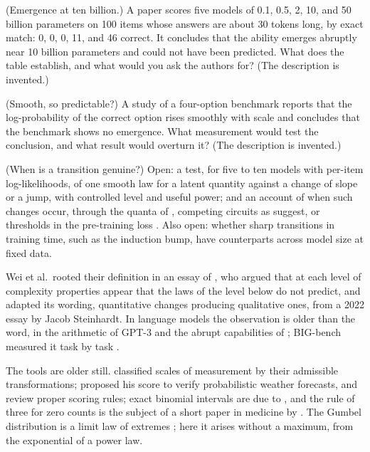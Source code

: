 \begin{refsection}
\begin{exercises}
\item \critique (Emergence at ten billion.) A paper scores five models of 0.1, 0.5, 2, 10, and 50 billion parameters on 100 items whose answers are about 30 tokens long, by exact match: 0, 0, 0, 11, and 46 correct. It concludes that the ability emerges abruptly near 10 billion parameters and could not have been predicted. What does the table establish, and what would you ask the authors for? (The description is invented.)\label{ex:emergence:critique1}

\item \critique (Smooth, so predictable?) A study of a four-option benchmark reports that the log-probability of the correct option rises smoothly with scale and concludes that the benchmark shows no emergence. What measurement would test the conclusion, and what result would overturn it? (The description is invented.)\label{ex:emergence:critique2}

\item \research (When is a transition genuine?) Open: a test, for five to ten models with per-item log-likelihoods, of one smooth law for a latent quantity against a change of slope or a jump, with controlled level and useful power; and an account of when such changes occur, through the quanta of \textcite{MichaudEtAl2023}, competing circuits as \textcite{HuEtAl2024} suggest, or thresholds in the pre-training loss \parencite{DuEtAl2024}. Also open: whether sharp transitions in training time, such as the induction bump, have counterparts across model size at fixed data.\label{ex:emergence:research}
\end{exercises}

\notesandrefs
Wei et al.\ rooted their definition in an essay of \textcite{Anderson1972}, who argued that at each level of complexity properties appear that the laws of the level below do not predict, and adapted its wording, quantitative changes producing qualitative ones, from a 2022 essay by Jacob Steinhardt. In language models the observation is older than the word, in the arithmetic of GPT-3 \parencite{BrownEtAl2020} and the abrupt capabilities of \textcite{GanguliEtAl2022}; BIG-bench measured it task by task \parencite{SrivastavaEtAl2023}.

The tools are older still. \Textcite{Stevens1946} classified scales of measurement by their admissible transformations; \textcite{Brier1950} proposed his score to verify probabilistic weather forecasts, and \textcite{GneitingRaftery2007} review proper scoring rules; exact binomial intervals are due to \textcite{ClopperPearson1934}, and the rule of three for zero counts is the subject of a short paper in medicine by \textcite{HanleyLippmanHand1983}. The Gumbel distribution is a limit law of extremes \parencite{Gumbel1958}; here it arises without a maximum, from the exponential of a power law.


\end{refsection}
